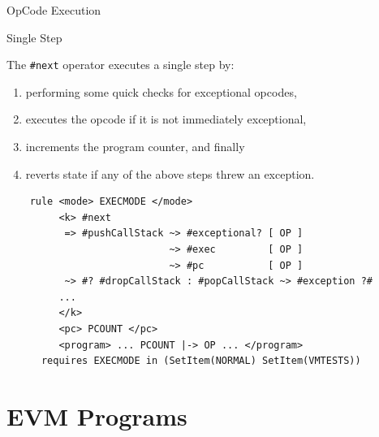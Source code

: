 \documentclass[8pt,ignorenonframetext,]{beamer}
\providecommand{\tightlist}{%
  \setlength{\itemsep}{0pt}\setlength{\parskip}{0pt}}
\begin{document}
\begin{frame}[fragile]{OpCode Execution}

\pause

\begin{block}{Single Step}

The \texttt{\#next} operator executes a single step by:

\begin{enumerate}
\def\labelenumi{\arabic{enumi}.}
\tightlist
\item
  performing some quick checks for exceptional opcodes,
\item
  executes the opcode if it is not immediately exceptional,
\item
  increments the program counter, and finally
\item
  reverts state if any of the above steps threw an exception.
\end{enumerate}

\pause

\begin{verbatim}
    rule <mode> EXECMODE </mode>
         <k> #next
          => #pushCallStack ~> #exceptional? [ OP ]
                            ~> #exec         [ OP ]
                            ~> #pc           [ OP ]
          ~> #? #dropCallStack : #popCallStack ~> #exception ?#
         ...
         </k>
         <pc> PCOUNT </pc>
         <program> ... PCOUNT |-> OP ... </program>
      requires EXECMODE in (SetItem(NORMAL) SetItem(VMTESTS))
\end{verbatim}

\end{block}

\end{frame}

\section{EVM Programs}\label{evm-programs}
\end{document}

